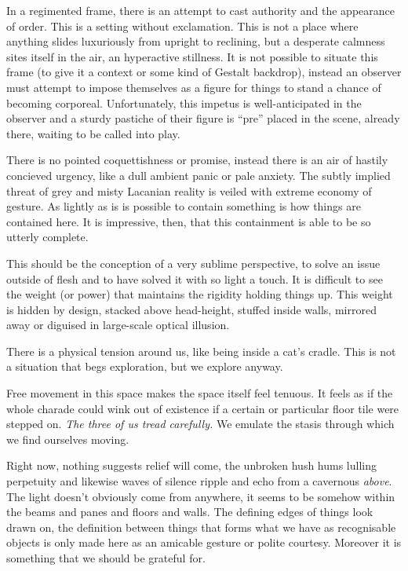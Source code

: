 \documentclass{book}
\begin{document}
In a regimented frame, there is an attempt to cast authority and the appearance
of order. This is a setting without exclamation. This is not a place where
anything slides luxuriously from upright to reclining, but a desperate calmness
sites itself in the air, an hyperactive stillness. It is not possible to
situate this frame (to give it a context or some kind of Gestalt backdrop),
instead an observer must attempt to impose themselves as a figure for things to
stand a chance of becoming corporeal. Unfortunately, this impetus is
well-anticipated in the observer and a sturdy pastiche of their figure is
``pre'' placed in the scene, already there, waiting to be called into play.

There is no pointed coquettishness or promise, instead there is an air of
hastily concieved urgency, like a dull ambient panic or pale anxiety. The
subtly implied threat of grey and misty Lacanian reality is veiled with extreme
economy of gesture. As lightly as is is possible to contain something is how
things are contained here. It is impressive, then, that this containment is
able to be so utterly complete.

This should be the conception of a very sublime perspective, to solve an issue
outside of flesh and to have solved it with so light a touch. It is difficult
to see the weight (or power) that maintains the rigidity holding things up.
This weight is hidden by design, stacked above head-height, stuffed inside
walls, mirrored away or diguised in large-scale optical illusion.

There is a physical tension around us, like being inside a cat's cradle. This
is not a situation that begs exploration, but we explore anyway.

Free movement in this space makes the space itself feel tenuous. It feels as if
the whole charade could wink out of existence if a certain or particular floor
tile were stepped on.  \emph{The three of us tread carefully.} We emulate the
stasis through which we find ourselves moving.

Right now, nothing suggests relief will come, the unbroken hush hums lulling
perpetuity and likewise waves of silence ripple and echo from a cavernous
\emph{above}.  The light doesn't obviously come from anywhere, it seems to be
somehow within the beams and panes and floors and walls. The defining edges of
things look drawn on, the definition between things that forms what we have as
recognisable objects is only made here as an amicable gesture or polite
courtesy. Moreover it is something that we should be grateful for.
\end{document}
